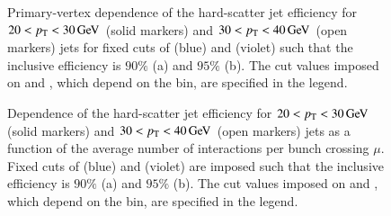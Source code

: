 \documentclass{atlasnote}
\begin{document}
\begin{figure}[!htbp]
  \centering
  \caption{Primary-vertex dependence of the hard-scatter 
           jet efficiency for $20 < p_{\mathrm{T}} < 30\,\text{Ge\hspace{-.08em}V}$ (solid markers) and $30 < p_{\mathrm{T}} < 40\,\text{Ge\hspace{-.08em}V}$ (open markers) 
           jets for fixed cuts of \JVT (blue) and \JVF (violet) such that the inclusive efficiency is $90\%$ (a) and $95\%$ (b).
           The cut values imposed on \JVT and \JVF, which depend on the \pT bin, are specified in the legend.}
  \label{fig:JVT_stab}
  \centering
  \caption{Dependence of the hard-scatter 
           jet efficiency for $20 < p_{\mathrm{T}} < 30\,\text{Ge\hspace{-.08em}V}$ (solid markers) and $30 < p_{\mathrm{T}} < 40\,\text{Ge\hspace{-.08em}V}$ (open markers) 
           jets as a function of the average number of interactions per bunch crossing $\mu$. 
           Fixed cuts of \JVT (blue) and \JVF (violet) are imposed such that the inclusive efficiency is $90\%$ (a) and $95\%$ (b).
           The cut values imposed on \JVT and \JVF, which depend on the \pT bin, are specified in the legend.}
  \label{fig:JVT_stab_mu}
\end{figure}
\end{document}
